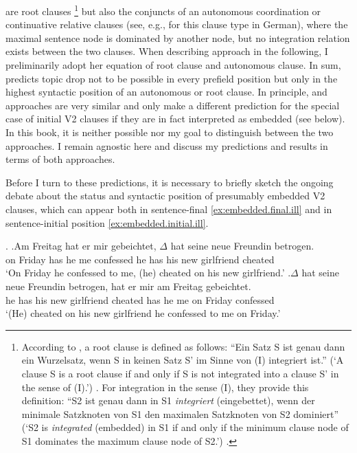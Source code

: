 %
are root clauses%
\footnote{According to \citet{reich.reis2013}, a root clause is defined as follows:
``Ein Satz S ist genau dann ein Wurzelsatz, wenn S in keinen Satz S’ im Sinne von (I) integriert ist.'' (`A clause S is a root clause if and only if S is not integrated into a clause S' in the sense of (I).') \citep[542, my translation]{reich.reis2013}.
For integration in the sense (I), they provide this definition:
``S2 ist genau dann in S1 \textit{integriert} (eingebettet), wenn der minimale Satzknoten von S1 den maximalen Satzknoten von S2 dominiert'' (`S2 is \textit{integrated} (embedded) in S1 if and only if the minimum clause node of S1 dominates the maximum clause node of S2.') \citep[537, my translation]{reich.reis2013}.
}
%
but also the conjuncts of an autonomous coordination or continuative relative clauses (see, e.g., \cite{blumel.etal2017} for this clause type in German), where the maximal sentence node is dominated by another node, but no integration relation exists between the two clauses.
When describing   approach in the following, I preliminarily adopt her equation of root clause and autonomous clause.
In sum, \citet{freywald2020} predicts topic drop not to be possible in every prefield position but only in the highest syntactic position of an autonomous or root clause.
In principle,  and  approaches are very similar and only make a different prediction for the special case of initial V2 clauses if they are in fact interpreted as embedded (see below).
In this book, it is neither possible nor my goal to distinguish between the two approaches.
I remain agnostic here and discuss my predictions and results in terms of both approaches.

Before I turn to these predictions, it is necessary to briefly sketch the ongoing debate about the status and syntactic position of presumably embedded V2 clauses, which can appear both in sentence-final \ref{ex:embedded.final.ill} and in sentence-initial position \ref{ex:embedded.initial.ill}.

\ex.
\ag.\label{ex:embedded.final.ill}Am Freitag hat er mir gebeichtet, $\Delta$ hat seine neue Freundin betrogen.\\
on Friday has he me confessed he has his new girlfriend cheated\\
`On Friday he confessed to me, (he) cheated on his new girlfriend.'
\bg.\label{ex:embedded.initial.ill}$\Delta$ hat seine neue Freundin betrogen, hat er mir am Freitag gebeichtet.\\
he has his new girlfriend cheated has he me on Friday confessed\\
`(He) cheated on his new girlfriend he confessed to me on Friday.'

